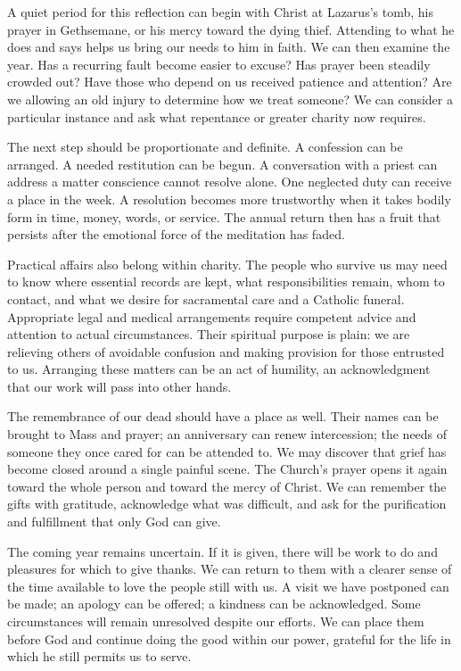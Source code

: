 A quiet period for this reflection can begin with Christ at Lazarus's tomb, his prayer in Gethsemane, or his mercy toward the dying thief. Attending to what he does and says helps us bring our needs to him in faith. We can then examine the year. Has a recurring fault become easier to excuse? Has prayer been steadily crowded out? Have those who depend on us received patience and attention? Are we allowing an old injury to determine how we treat someone? We can consider a particular instance and ask what repentance or greater charity now requires.

The next step should be proportionate and definite. A confession can be arranged. A needed restitution can be begun. A conversation with a priest can address a matter conscience cannot resolve alone. One neglected duty can receive a place in the week. A resolution becomes more trustworthy when it takes bodily form in time, money, words, or service. The annual return then has a fruit that persists after the emotional force of the meditation has faded.

Practical affairs also belong within charity. The people who survive us may need to know where essential records are kept, what responsibilities remain, whom to contact, and what we desire for sacramental care and a Catholic funeral. Appropriate legal and medical arrangements require competent advice and attention to actual circumstances. Their spiritual purpose is plain: we are relieving others of avoidable confusion and making provision for those entrusted to us. Arranging these matters can be an act of humility, an acknowledgment that our work will pass into other hands.

The remembrance of our dead should have a place as well. Their names can be brought to Mass and prayer; an anniversary can renew intercession; the needs of someone they once cared for can be attended to. We may discover that grief has become closed around a single painful scene. The Church's prayer opens it again toward the whole person and toward the mercy of Christ. We can remember the gifts with gratitude, acknowledge what was difficult, and ask for the purification and fulfillment that only God can give.

The coming year remains uncertain. If it is given, there will be work to do and pleasures for which to give thanks. We can return to them with a clearer sense of the time available to love the people still with us. A visit we have postponed can be made; an apology can be offered; a kindness can be acknowledged. Some circumstances will remain unresolved despite our efforts. We can place them before God and continue doing the good within our power, grateful for the life in which he still permits us to serve.

